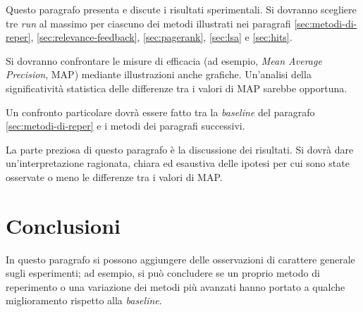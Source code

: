 \documentclass{llncs}
\begin{document}
Questo paragrafo presenta e discute i risultati sperimentali. Si dovranno
scegliere tre \textit{run} al massimo per ciascuno dei metodi illustrati nei
paragrafi \ref{sec:metodi-di-reper}, \ref{sec:relevance-feedback},
\ref{sec:pagerank}, \ref{sec:lsa} e \ref{sec:hits}.  

Si dovranno confrontare le misure di efficacia (ad esempio, \textit{Mean Average
  Precision}, MAP) mediante illustrazioni anche grafiche. Un'analisi della
significativit\`a statistica delle differenze tra i valori di MAP sarebbe
opportuna.

Un confronto particolare dovr\`a essere fatto tra la \textit{baseline} del
paragrafo \ref{sec:metodi-di-reper} e i metodi dei paragrafi successivi.

La parte preziosa di questo paragrafo \`e la discussione dei risultati. Si
dovr\`a dare un'interpretazione ragionata, chiara ed esaustiva delle ipotesi per
cui sono state osservate o meno le differenze tra i valori di MAP. 

\section{Conclusioni}
\label{sec:conclusioni}

In questo paragrafo si possono aggiungere delle osservazioni di carattere
generale sugli esperimenti; ad esempio, si pu\`o concludere se un proprio metodo
di reperimento o una variazione dei metodi pi\`u avanzati hanno portato a
qualche miglioramento rispetto alla \textit{baseline}.
\end{document}
